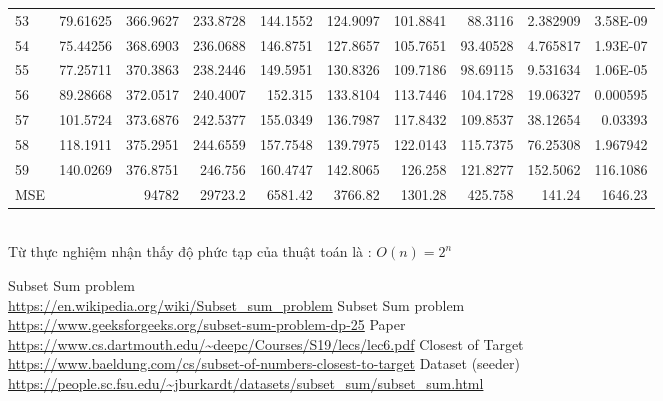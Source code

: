 \documentclass[a4paper]{article}
\begin{document}
{\begin{tabular}{|l|r|r|r|r|r|r|r|r|r|}
    {53} & 79.61625 & 366.9627 & 233.8728 & 144.1552 & 124.9097 & 101.8841 & 88.3116 & 2.382909 & 3.58E-09 \\
    {54} & 75.44256 & 368.6903 & 236.0688 & 146.8751 & 127.8657 & 105.7651 & 93.40528 & 4.765817 & 1.93E-07 \\
    {55} & 77.25711 & 370.3863 & 238.2446 & 149.5951 & 130.8326 & 109.7186 & 98.69115 & 9.531634 & 1.06E-05 \\
    {56} & 89.28668 & 372.0517 & 240.4007 & 152.315 & 133.8104 & 113.7446 & 104.1728 & 19.06327 & 0.000595 \\
    {57} & 101.5724 & 373.6876 & 242.5377 & 155.0349 & 136.7987 & 117.8432 & 109.8537 & 38.12654 & 0.03393 \\
    {58} & 118.1911 & 375.2951 & 244.6559 & 157.7548 & 139.7975 & 122.0143 & 115.7375 & 76.25308 & 1.967942 \\
    {59} & 140.0269 & 376.8751 & 246.756 & 160.4747 & 142.8065 & 126.258 & 121.8277 & 152.5062 & 116.1086 \\
    \hline
    MSE   &       & 94782 & 29723.2 & 6581.42 & 3766.82 & 1301.28 & 425.758 & 141.24 & 1646.23 \\
    \hline
\end{tabular}}
\\
Từ thực nghiệm nhận thấy độ phức tạp của thuật toán là : $ O(n) = 2^n$
\newpage

\begin{thebibliography}{9}
Subset Sum problem \\
\url{https://en.wikipedia.org/wiki/Subset_sum_problem}
Subset Sum problem \\
\url{https://www.geeksforgeeks.org/subset-sum-problem-dp-25}
Paper \\
\url{https://www.cs.dartmouth.edu/~deepc/Courses/S19/lecs/lec6.pdf}
Closest of Target \\
\url{https://www.baeldung.com/cs/subset-of-numbers-closest-to-target}
Dataset (seeder) \\
\url{https://people.sc.fsu.edu/~jburkardt/datasets/subset_sum/subset_sum.html}
\end{thebibliography}
\end{document}
